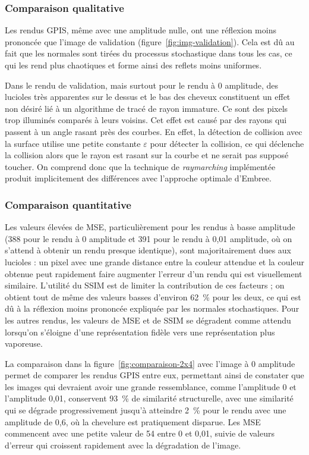 \subsubsection{Comparaison qualitative}

Les rendus GPIS, même avec une amplitude nulle, ont une réflexion moins prononcée que l'image de validation (figure~\ref{fig:img-validation}). Cela est dû au fait que les normales sont tirées du processus stochastique dans tous les cas, ce qui les rend plus chaotiques et forme ainsi des reflets moins uniformes.

Dans le rendu de validation, mais surtout pour le rendu à 0 amplitude, des lucioles très apparentes sur le dessus et le bas des cheveux constituent un effet non désiré lié à un algorithme de tracé de rayon immature. Ce sont des pixels trop illuminés comparés à leurs voisins. Cet effet est causé par des rayons qui passent à un angle rasant près des courbes. En effet, la détection de collision avec la surface utilise une petite constante $\varepsilon$ pour détecter la collision, ce qui déclenche la collision alors que le rayon est rasant sur la courbe et ne serait pas supposé toucher. On comprend donc que la technique de \textit{raymarching} implémentée produit implicitement des différences avec l'approche optimale d'Embree.

\subsubsection{Comparaison quantitative}

Les valeurs élevées de MSE, particulièrement pour les rendus à basse amplitude (388 pour le rendu à 0 amplitude et 391 pour le rendu à 0,01 amplitude, où on s'attend à obtenir un rendu presque identique), sont majoritairement dues aux lucioles : un pixel avec une grande distance entre la couleur attendue et la couleur obtenue peut rapidement faire augmenter l'erreur d'un rendu qui est visuellement similaire. L'utilité du SSIM est de limiter la contribution de ces facteurs ; on obtient tout de même des valeurs basses d'environ 62~\% pour les deux, ce qui est dû à la réflexion moins prononcée expliquée par les normales stochastiques. Pour les autres rendus, les valeurs de MSE et de SSIM se dégradent comme attendu lorsqu'on s'éloigne d'une représentation fidèle vers une représentation plus vaporeuse.

La comparaison dans la figure~\ref{fig:comparaison-2x4} avec l'image à 0 amplitude permet de comparer les rendus GPIS entre eux, permettant ainsi de constater que les images qui devraient avoir une grande ressemblance, comme l'amplitude 0 et l'amplitude 0,01, conservent 93~\% de similarité structurelle, avec une similarité qui se dégrade progressivement jusqu'à atteindre 2~\% pour le rendu avec une amplitude de 0,6, où la chevelure est pratiquement disparue. Les MSE commencent avec une petite valeur de 54 entre 0 et 0,01, suivie de valeurs d'erreur qui croissent rapidement avec la dégradation de l'image.

